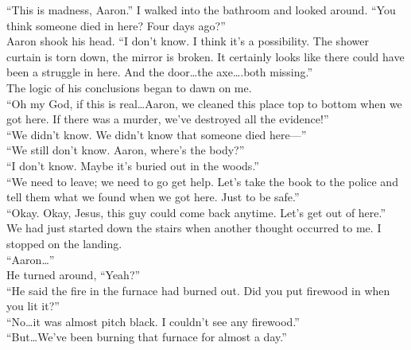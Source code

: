 \documentclass[a5paper]{scrartcl}
\begin{document}
\enquote{This is madness, Aaron.} I walked into the bathroom and looked around. \enquote{You think someone died in here? Four days ago?}\\


Aaron shook his head. \enquote{I don't know. I think it's a possibility. The shower curtain is torn down, the mirror is broken. It certainly looks like there could have been a struggle in here. And the door\dots the axe\dots .both missing.}\\


The logic of his conclusions began to dawn on me.\\


\enquote{Oh my God, if this is real\dots  Aaron, we cleaned this place top to bottom when we got here. If there was a murder, we've destroyed all the evidence!}\\


\enquote{We didn't know. We didn't know that someone died here---}\\


\enquote{We still don't know.  Aaron, where's the body?}\\


\enquote{I don't know. Maybe it's buried out in the woods.}\\


\enquote{We need to leave; we need to go get help. Let's take the book to the police and tell them what we found when we got here. Just to be safe.}\\


\enquote{Okay. Okay, Jesus, this guy could come back anytime. Let's get out of here.}\\


We had just started down the stairs when another thought occurred to me. I stopped on the landing.\\


\enquote{Aaron\dots }\\


He turned around, \enquote{Yeah?}\\


\enquote{He said the fire in the furnace had burned out. Did you put firewood in when you lit it?}\\


\enquote{No\dots it was almost pitch black. I couldn't see any firewood.}\\


\enquote{But\dots We've been burning that furnace for almost a day.}\\
\end{document}
